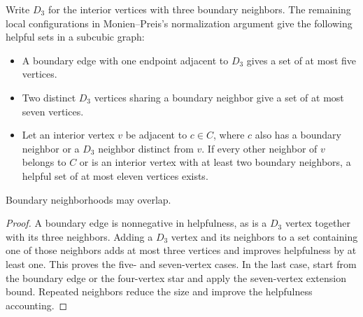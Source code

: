 \begin{theorem}
  \label{thm:lowerbounds-algebraic-normalization-configurations}
  \leanok
  Write $D_3$ for the interior vertices with three boundary neighbors.
  The remaining local configurations in Monien--Preis's normalization
  argument give the following helpful sets in a subcubic graph:
  \begin{itemize}
    \item A boundary edge with one endpoint adjacent to $D_3$ gives
      a set of at most five vertices.
    \item Two distinct $D_3$ vertices sharing a boundary neighbor give
      a set of at most seven vertices.
    \item Let an interior vertex $v$ be adjacent to $c\in C$, where
      $c$ also has a boundary neighbor or a $D_3$ neighbor distinct from $v$.
      If every other neighbor of $v$ belongs to $C$ or is an interior
      vertex with at least two boundary neighbors, a helpful set of
      at most eleven vertices exists.
  \end{itemize}
  Boundary neighborhoods may overlap.
\end{theorem}
\begin{proof}
  \leanok
  A boundary edge is nonnegative in helpfulness, as is a $D_3$ vertex
  together with its three neighbors. Adding a $D_3$ vertex and its
  neighbors to a set containing one of those neighbors adds at most
  three vertices and improves helpfulness by at least one. This proves
  the five- and seven-vertex cases. In the last case, start from the
  boundary edge or the four-vertex star and apply the seven-vertex
  extension bound. Repeated neighbors reduce the size and improve the
  helpfulness accounting.
\end{proof}


